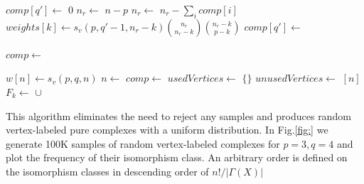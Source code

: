 \documentclass[12pt]{article}
\theoremstyle{plain}
\theoremstyle{definition}
\theoremstyle{remark}
\begin{document}
\begin{algorithm}
\caption{\label{alg:weak-composition} Generates a weak composition of $n$.}
    \begin{algorithmic}[1]
        \State$comp[q'] \gets$ $0$ 
        \EndFor
        \State $n_r \gets$ $n-p$ 
        \State$n_r \gets$ $n_r - \sum_i comp[i]$ 
                \State $weights[k] \gets s_v(p,q'-1,n_r-k)\binom{n_r}{n_r-k}\binom{n_r-k}{p-k}$ 
            \EndFor
            \State $comp[q'] \gets $

        \EndFor
        \State $comp \gets $
        \EndFunction
     \end{algorithmic}
 \end{algorithm}

\begin{algorithm}
\caption{\label{alg:efficientRandomVertexLabeled} Samples a random pure vertex-labeled complex from a uniform distribution sequentially.}
    \begin{algorithmic}[1]
        \State $w[n] \gets s_v(p,q,n)$
        \State $n \gets $
        \State $comp \gets $
        \State $usedVertices \gets$ $\{\}$
        \State $unusedVertices \gets$ $[n]$
            \State$F_k \gets$ $\cup$ 
        \EndFor
        
        \EndFunction
     \end{algorithmic}
 \end{algorithm}


This algorithm eliminates the need to reject any samples and produces random vertex-labeled pure complexes with a uniform distribution. In Fig.\ref{fig:} we generate 100K samples of random vertex-labeled complexes for $p=3, q=4$ and plot the frequency of their isomorphism class. An arbitrary order is defined on the isomorphism classes in descending order of $n!/|\Gamma(X)|$
\end{document}
